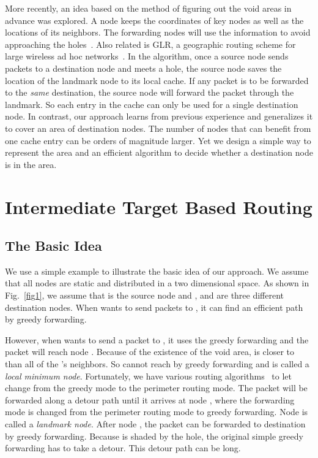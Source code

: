 \documentclass[3p,times]{elsarticle}
\begin{document}
More recently, an idea based on the method of figuring out the void areas
in advance was explored.
A node keeps the coordinates of key nodes as well as the locations of its neighbors.
The forwarding nodes will use the information to avoid approaching the
holes~\cite{ex20,ex21,ex22}.
Also related is GLR,
a geographic routing scheme for large wireless ad hoc networks~\cite{ex26}.
In the algorithm, once a source node sends packets to a destination
node and meets a hole, the source node saves the location of the landmark node
to its local cache. If any packet is to be forwarded to the {\em same} destination,
the source node will forward
the packet through the landmark.
So each entry in the cache can only be used for a single destination node.
In contrast, our approach learns from previous experience and generalizes it to cover an area
of destination nodes. The number of nodes that can benefit from one cache entry can be
orders of magnitude larger.
Yet we design a simple way to represent the area and
an efficient algorithm to decide whether a destination node is in the area.




\section{Intermediate Target Based Routing}
\label{shadedarea}

\subsection{The Basic Idea}


We use a simple example to illustrate the basic idea of our approach.
We assume that all nodes are static and distributed in a two dimensional space.
As shown in Fig.~\ref{fig1}, we assume that
 is the source node and
,  and  are three different destination nodes.
When  wants to send packets to , it can find an efficient path by greedy forwarding.

However,
when  wants to send a packet to , it uses the greedy forwarding and the packet will reach node .
Because of the existence of the void area,  is closer to  than all of the 's neighbors.
So  cannot reach  by greedy forwarding and is called a {\em local minimum node}.
Fortunately, we have various routing algorithms~\cite{ex13} to let
 change from the greedy mode to the perimeter routing mode.
The packet will be forwarded along a
detour path until it arrives at node ,
where the forwarding mode is changed from the perimeter routing mode
to greedy forwarding.
Node  is called a {\em landmark node}.
After node , the packet can be forwarded to destination  by greedy forwarding.
Because  is shaded by the hole, the original simple greedy forwarding
has to take a detour. This detour path can be long.
\end{document}
